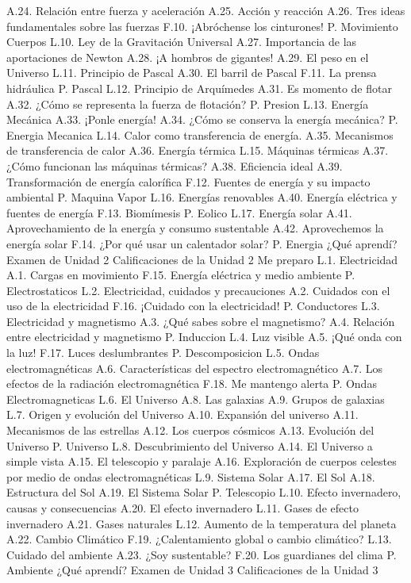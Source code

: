 A.24. Relación entre fuerza y aceleración
A.25. Acción y reacción
A.26. Tres ideas fundamentales sobre las fuerzas
F.10. ¡Abróchense los cinturones!
P. Movimiento Cuerpos
L.10. Ley de la Gravitación Universal
A.27. Importancia de las aportaciones de Newton
A.28. ¡A hombros de gigantes!
A.29. El peso en el Universo
L.11. Principio de Pascal
A.30. El barril de Pascal
F.11. La prensa hidráulica
P. Pascal
L.12. Principio de Arquímedes
A.31. Es momento de flotar
A.32. ¿Cómo se representa la fuerza de flotación?
P. Presion
L.13. Energía Mecánica
A.33. ¡Ponle energía!
A.34. ¿Cómo se conserva la energía mecánica?
P. Energia Mecanica
L.14. Calor como transferencia de energía.
A.35. Mecanismos de transferencia de calor
A.36. Energía térmica
L.15. Máquinas térmicas
A.37. ¿Cómo funcionan las máquinas térmicas?
A.38. Eficiencia ideal
A.39. Transformación de energía calorífica
F.12. Fuentes de energía y su impacto ambiental
P. Maquina Vapor
L.16. Energías renovables
A.40. Energía eléctrica y fuentes de energía
F.13. Biomímesis
P. Eolico
L.17. Energía solar
A.41. Aprovechamiento de la energía y consumo sustentable
A.42. Aprovechemos la energía solar
F.14. ¿Por qué usar un calentador solar?
P. Energia
¿Qué aprendí?
Examen de Unidad 2
Calificaciones de la Unidad 2
Me preparo
L.1. Electricidad
A.1. Cargas en movimiento
F.15. Energía eléctrica y medio ambiente
P. Electrostaticos
L.2. Electricidad, cuidados y precauciones 
A.2. Cuidados con el uso de la electricidad
F.16. ¡Cuidado con la electricidad!
P. Conductores
L.3. Electricidad y magnetismo 
A.3. ¿Qué sabes sobre el magnetismo?
A.4. Relación entre electricidad y magnetismo
P. Induccion
L.4. Luz visible 
A.5. ¡Qué onda con la luz!
F.17. Luces deslumbrantes
P. Descomposicion
L.5. Ondas electromagnéticas
A.6. Características del espectro electromagnético
A.7. Los efectos de la radiación electromagnética
F.18. Me mantengo alerta
P. Ondas Electromagneticas
L.6. El Universo 
A.8. Las galaxias
A.9. Grupos de galaxias
L.7. Origen y evolución del Universo 
A.10. Expansión del universo
A.11. Mecanismos de las estrellas
A.12. Los cuerpos cósmicos
A.13. Evolución del Universo
P. Universo
L.8. Descubrimiento del Universo
A.14. El Universo a simple vista
A.15. El telescopio y paralaje
A.16. Exploración de cuerpos celestes por medio de ondas electromagnéticas
L.9. Sistema Solar 
A.17. El Sol
A.18. Estructura del Sol
A.19. El Sistema Solar
P. Telescopio
L.10. Efecto invernadero, causas y consecuencias 
A.20. El efecto invernadero
L.11. Gases de efecto invernadero 
A.21. Gases naturales
L.12. Aumento de la temperatura del planeta 
A.22. Cambio Climático
F.19. ¿Calentamiento global o cambio climático?
L.13. Cuidado del ambiente 
A.23. ¿Soy sustentable?
F.20. Los guardianes del clima
P. Ambiente
¿Qué aprendí?
Examen de Unidad 3
Calificaciones de la Unidad 3